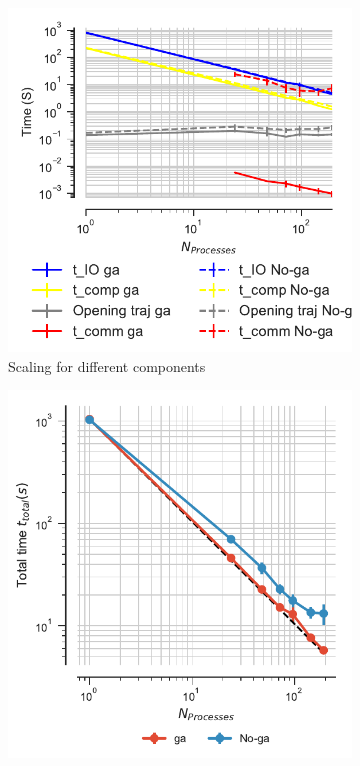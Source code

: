 \begin{figure}[ht!]
\centering
\begin{subfigure}{.3\textwidth}
  \includegraphics[width=\linewidth]{figures/Comparison_IO_compute_scaling_traj_splitting.pdf}
  \caption{Scaling for different components}
  \label{fig:ScalingComputeIO-split}
\end{subfigure}
\hfill
\begin{subfigure}{.3\textwidth}
  \includegraphics[width=\linewidth]{figures/Comparison_tot_time_traj_splitting.pdf}

\end{subfigure}
\end{figure}
